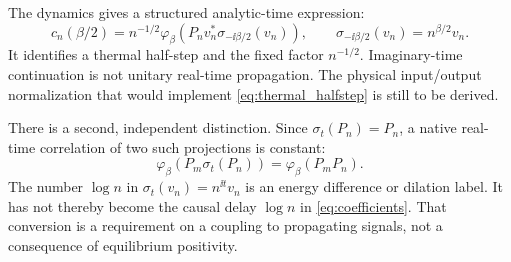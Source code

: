 The dynamics gives a structured analytic-time expression:
\begin{equation}
 c_n(\beta/2)=n^{-1/2}\varphi_\beta
 \left(P_n v_n^*\sigma_{-\ii\beta/2}(v_n)\right),\qquad
 \sigma_{-\ii\beta/2}(v_n)=n^{\beta/2}v_n.
 \label{eq:thermal_halfstep}
\end{equation}
It identifies a thermal half-step and the fixed factor $n^{-1/2}$.
Imaginary-time continuation is not unitary real-time propagation.
The physical input/output normalization that would implement
\eqref{eq:thermal_halfstep} is still to be derived.

There is a second, independent distinction. Since
$\sigma_t(P_n)=P_n$, a native real-time correlation of two such
projections is constant:
\begin{equation}
 \varphi_\beta(P_m\sigma_t(P_n))=\varphi_\beta(P_mP_n).
\end{equation}
The number $\log n$ in $\sigma_t(v_n)=n^{\ii t}v_n$ is an energy
difference or dilation label. It has not thereby become the causal
delay $\log n$ in \eqref{eq:coefficients}. That conversion is a
requirement on a coupling to propagating signals, not a consequence
of equilibrium positivity.
